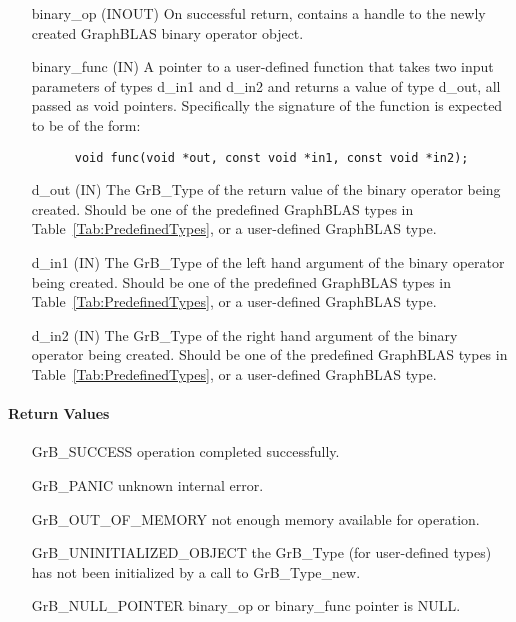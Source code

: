 \begin{itemize}[leftmargin=1.1in]
    \item[{\sf binary\_op}] ({\sf INOUT}) On successful return, contains a 
          handle to the newly created GraphBLAS binary operator object.
    \item[{\sf binary\_func}] ({\sf IN}) A pointer to a user-defined function that 
          takes two input parameters of types {\sf d\_in1} and {\sf d\_in2} and returns a value of
		type {\sf d\_out}, all passed as {\sf void} pointers.
          Specifically the signature of the function is expected to 
          be of the form:
      \begin{verbatim}
      void func(void *out, const void *in1, const void *in2);
      \end{verbatim}
    \item[{\sf d\_out}]  ({\sf IN}) The {\sf GrB\_Type} of the return
          value of the binary operator being created. Should be one of the
          predefined GraphBLAS types in Table~\ref{Tab:PredefinedTypes}, or a 
          user-defined GraphBLAS type.
    \item[{\sf d\_in1}]  ({\sf IN}) The {\sf GrB\_Type} of the left hand 
          argument of the binary operator being created. Should be one of the
          predefined GraphBLAS types in Table~\ref{Tab:PredefinedTypes}, or a
          user-defined GraphBLAS type.
    \item[{\sf d\_in2}]  ({\sf IN}) The {\sf GrB\_Type} of the right hand 
          argument of the binary operator being created. Should be one of the
          predefined GraphBLAS types in Table~\ref{Tab:PredefinedTypes}, or a 
          user-defined GraphBLAS type.
\end{itemize}

\paragraph{Return Values}

\begin{itemize}[leftmargin=2.1in]
\item[{\sf GrB\_SUCCESS}]           operation completed successfully.
\item[{\sf GrB\_PANIC}]             unknown internal error.
\item[{\sf GrB\_OUT\_OF\_MEMORY}]          not enough memory available for operation.
\item[{\sf GrB\_UNINITIALIZED\_OBJECT}]          the {\sf GrB\_Type} (for user-defined types)
                                    has not been initialized by a call to {\sf GrB\_Type\_new}.
\item[{\sf GrB\_NULL\_POINTER}]    {\sf binary\_op} or {\sf binary\_func} pointer is {\sf NULL}.

\end{itemize}

